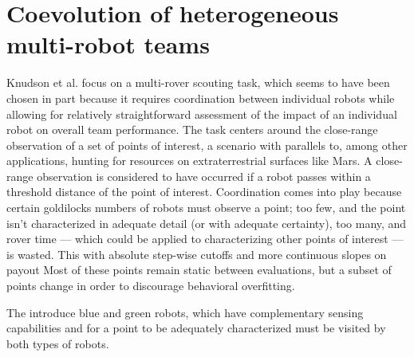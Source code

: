 \section{Coevolution of heterogeneous multi-robot teams \cite{knudson2010coevolution}}

Knudson et al. focus on a multi-rover scouting task, which seems to have been chosen in part because it requires coordination between individual robots while allowing for relatively straightforward assessment of the impact of an individual robot on overall team performance.
The task centers around the close-range observation of a set of points of interest, a scenario with parallels to, among other applications, hunting for resources on extraterrestrial surfaces like Mars.
A close-range observation is considered to have occurred if a robot passes within a threshold distance of the point of interest.
Coordination comes into play because certain goldilocks numbers of robots must observe a point; too few, and the point isn't characterized in adequate detail (or with adequate certainty), too many, and rover time --- which could be applied to characterizing other points of interest --- is wasted.
This with absolute step-wise cutoffs and more continuous slopes on payout
Most of these points remain static between evaluations, but a subset of points change in order to discourage behavioral overfitting.

The introduce blue and green robots, which have complementary sensing capabilities and for a point to be adequately characterized must be visited by both types of robots.
